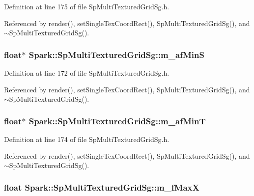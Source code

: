 Definition at line 175 of file Sp\-Multi\-Textured\-Grid\-Sg.h.

Referenced by render(), set\-Single\-Tex\-Coord\-Rect(), Sp\-Multi\-Textured\-Grid\-Sg(), and $\sim$Sp\-Multi\-Textured\-Grid\-Sg().
\subsubsection{\setlength{\rightskip}{0pt plus 5cm}float$\ast$ {\bf Spark::Sp\-Multi\-Textured\-Grid\-Sg::m\_\-af\-Min\-S}\hspace{0.3cm}{\tt  [protected]}}\label{classSpark_1_1SpMultiTexturedGridSg_p8}


Definition at line 172 of file Sp\-Multi\-Textured\-Grid\-Sg.h.

Referenced by render(), set\-Single\-Tex\-Coord\-Rect(), Sp\-Multi\-Textured\-Grid\-Sg(), and $\sim$Sp\-Multi\-Textured\-Grid\-Sg().
\subsubsection{\setlength{\rightskip}{0pt plus 5cm}float$\ast$ {\bf Spark::Sp\-Multi\-Textured\-Grid\-Sg::m\_\-af\-Min\-T}\hspace{0.3cm}{\tt  [protected]}}\label{classSpark_1_1SpMultiTexturedGridSg_p10}


Definition at line 174 of file Sp\-Multi\-Textured\-Grid\-Sg.h.

Referenced by render(), set\-Single\-Tex\-Coord\-Rect(), Sp\-Multi\-Textured\-Grid\-Sg(), and $\sim$Sp\-Multi\-Textured\-Grid\-Sg().
\subsubsection{\setlength{\rightskip}{0pt plus 5cm}float {\bf Spark::Sp\-Multi\-Textured\-Grid\-Sg::m\_\-f\-Max\-X}\hspace{0.3cm}{\tt  [protected]}}\label{classSpark_1_1SpMultiTexturedGridSg_p5}


